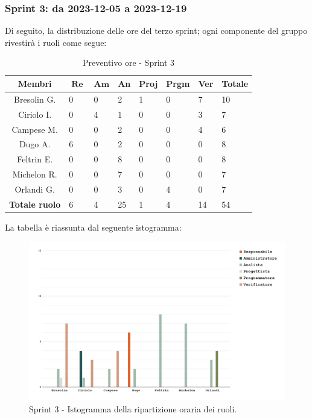\documentclass[10pt, a4paper]{article}
\begin{document}
{{{{{{{{{{\subsubsection{Sprint 3: da 2023-12-05 a 2023-12-19}
Di seguito, la distribuzione delle ore del terzo sprint; ogni componente del gruppo rivestirà i ruoli come segue:
\begin{table}[H]
\begin{tabularx}{\textwidth}{c|X|X|X|X|X|X|X}
        \textbf{Membri} & $\operatorname{\textbf{Re}}$ & $\mathrm{\textbf{Am}}$ & \textbf{An} & \textbf{Proj} & \textbf{Prgm} & \textbf{Ver} & \textbf{Totale} \\
        \hline Bresolin G. & 0 & 0 & 2 & 1 & 0 & \cellcolor{primarycolor}7 & 10 \\
        \hline Ciriolo I.  & 0 & \cellcolor{primarycolor}4 & 1 & 0 & 0 & 3 & 7 \\
        \hline Campese M.  & 0 & 0 & \cellcolor{primarycolor}2 & 0 & 0 & 4 & 6 \\
        \hline Dugo A.     & \cellcolor{primarycolor}6 & 0 & 2 & 0 & 0 & 0 & 8 \\
        \hline Feltrin E.  & 0 & 0 & \cellcolor{primarycolor}8 & 0 & 0 & 0 & 8 \\
        \hline Michelon R. & 0 & 0 & \cellcolor{primarycolor}7 & 0 & 0 & 0 & 7 \\
        \hline Orlandi G.  & 0 & 0 & 3 & 0 & \cellcolor{primarycolor}4 & 0 & 7 \\
        \hline
        \textbf{Totale ruolo} & 6 & 4 & 25 & 1 & 4 & 14 & 54 
    \end{tabularx}
    \caption{Preventivo ore - Sprint 3}
    \end{table}

La tabella è riassunta dal seguente istogramma:
 \begin{figure}[H]
        \centering        
        \includegraphics[width=15.5cm]{istogrammi/istogramma_3_periodo.png}
        \caption{Sprint 3 - Istogramma della ripartizione oraria dei ruoli. }
    \end{figure}

}}}}}}}}}}
\end{document}
